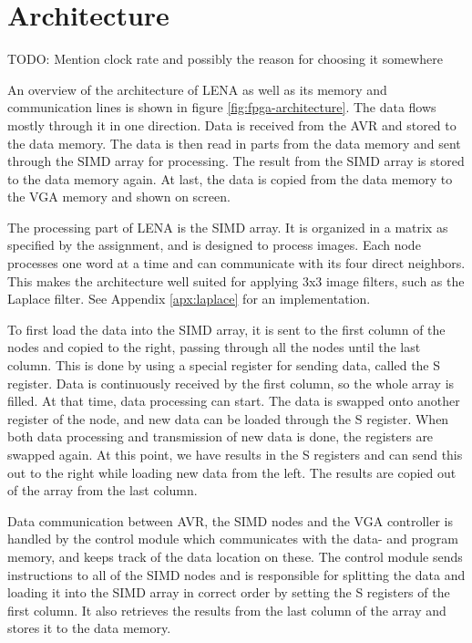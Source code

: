 \section{Architecture}



{\sc TODO: \color{red} Mention clock rate and possibly the reason for choosing
  it somewhere}

An overview of the architecture of \ac{LENA} as well as its memory and
communication lines is shown in figure \ref{fig:fpga-architecture}. The data
flows mostly through it in one direction. Data is received from the AVR and
stored to the data memory. The data is then read in parts from the data memory
and sent through the \ac{SIMD} array for processing. The result from the
\ac{SIMD} array is stored to the data memory again.  At last, the data is copied
from the data memory to the \ac{VGA} memory and shown on screen.

The processing part of \ac{LENA} is the \ac{SIMD} array. It is organized in a
matrix as specified by the assignment, and is designed to process images. Each
node processes one word at a time and can communicate with its four direct
neighbors. This makes the architecture  well suited for applying 3x3
image filters, such as the Laplace filter. See Appendix \ref{apx:laplace} for an
implementation.

To first load the data into the \ac{SIMD} array, it is sent to the first column
of the nodes and copied to the right, passing through all the nodes until the
last column.  This is done by using a special register for sending data, called
the S register. Data is continuously
received by the first column, so the whole array is filled. At that time, data
processing can start. The data is swapped onto another register of the node, and
new data can be loaded through the S register.  When both data processing and
transmission of new data is done, the registers are swapped again. At this
point, we have results in the S registers and can send this out to the right
while loading new data from the left. The results are copied out of the array
from the last column.

Data communication between AVR, the \ac{SIMD} nodes and the \ac{VGA}
controller is handled by the control module which communicates with the data-
and program memory, and keeps track of the data location on these. The control
module sends instructions to all of the \ac{SIMD} nodes and is responsible for
splitting the data and loading it into the \ac{SIMD} array in correct order by
setting the S registers of the first column. It also retrieves the results from
the last column of the array and stores it to the data memory.

